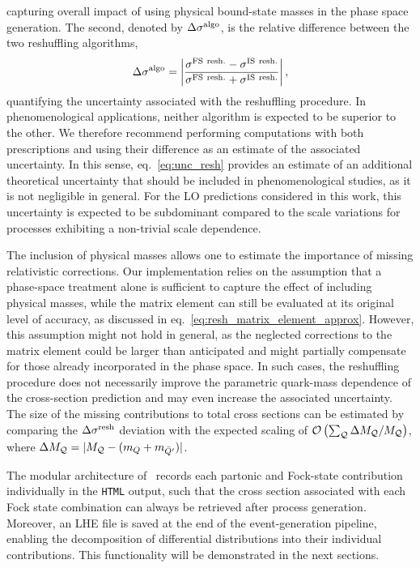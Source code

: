 capturing overall impact of using physical bound-state masses in the phase space generation. The second, denoted by $\Delta \sigma^{\rm algo}$, is the relative difference between the two reshuffling algorithms,
\begin{equation}\label{eq:unc_resh}
    \Delta\sigma^{\rm algo} = \left\vert \frac{\sigma^{\rm FS\ resh.} - \sigma^{\rm IS\ resh.}}{\sigma^{\rm FS\ resh.} + \sigma^{\rm IS\ resh.}} \right\vert,
\end{equation}
quantifying the uncertainty associated with the reshuffling procedure.
In phenomenological applications, neither algorithm is expected to be superior to the other. We therefore recommend performing computations with both prescriptions and using their difference as an estimate of the associated uncertainty. In this sense, eq.~\eqref{eq:unc_resh} provides an estimate of an additional theoretical uncertainty that should be included in phenomenological studies, as it is not negligible in general. For the LO predictions considered in this work, this uncertainty is expected to be subdominant compared to the scale variations for processes exhibiting a non-trivial scale dependence.

The inclusion of physical masses allows one to estimate the importance of missing relativistic corrections. Our implementation relies on the assumption that a phase-space treatment alone is sufficient to capture the effect of including physical masses, while the matrix element can still be evaluated at its original level of accuracy, as discussed in eq.~\eqref{eq:resh_matrix_element_approx}.
However, this assumption might not hold in general, as the neglected corrections to the matrix element could be larger than anticipated and might partially compensate for those already incorporated in the phase space. In such cases, the reshuffling procedure does not necessarily improve the parametric quark-mass dependence of the cross-section prediction and may even increase the associated uncertainty.
The size of the missing contributions to total cross sections can be estimated by comparing the $\Delta\sigma^{\rm resh}$ deviation with the expected scaling of ${\cal O} \left( \sum_{\cal Q}\Delta M_{\cal Q}/ M_{\cal Q}\right)$, where $\Delta M_{\cal Q} = \vert M_{\cal Q} - (m_Q + m_{\bar{Q}'}) \vert$.

The modular architecture of \mgshort\ records each partonic and Fock-state contribution individually in the {\tt HTML} output, such that the cross section associated with each Fock state combination can always be retrieved after process generation.
Moreover, an LHE file is saved at the end of the event-generation pipeline, enabling the decomposition of differential distributions into their individual contributions. This functionality will be demonstrated in the next sections.

